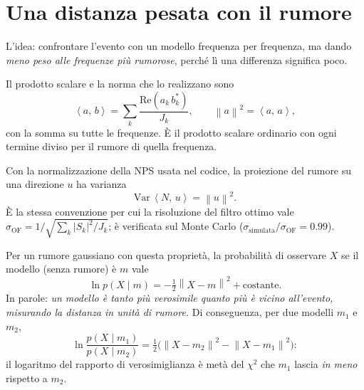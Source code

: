\documentclass[11pt,a4paper]{article}
\newcommand{\scal}[2]{\left\langle #1,\, #2 \right\rangle}
\newcommand{\norm}[1]{\left\lVert #1 \right\rVert}
\begin{document}
\section{Una distanza pesata con il rumore}
\begin{idea}
L'idea: confrontare l'evento con un modello frequenza per frequenza, ma dando \emph{meno peso alle
frequenze più rumorose}, perché lì una differenza significa poco.
\end{idea}
Il prodotto scalare e la norma che lo realizzano sono
\begin{equation}
  \scal{a}{b} = \sum_k \frac{\mathrm{Re}\!\left(a_k\, b_k^{*}\right)}{J_k},
  \qquad \norm{a}^2 = \scal{a}{a},
  \label{eq:metrica}
\end{equation}
con la somma su tutte le frequenze. È il prodotto scalare ordinario con ogni termine diviso per il
rumore di quella frequenza.

Con la normalizzazione della NPS usata nel codice, la proiezione del rumore su una direzione $u$
ha varianza
\begin{equation}
  \mathrm{Var}\,\scal{N}{u} = \norm{u}^2 .
  \label{eq:varianza}
\end{equation}
È la stessa convenzione per cui la risoluzione del filtro ottimo vale
$\sigma_\mathrm{OF} = 1/\sqrt{\sum_k |S_k|^2/J_k}$; è verificata sul Monte Carlo
($\sigma_\text{simulata}/\sigma_\mathrm{OF} = 0.99$).

Per un rumore gaussiano con questa proprietà, la probabilità di osservare $X$ se il modello
(senza rumore) è $m$ vale
\begin{equation}
  \ln p(X \mid m) = -\tfrac12 \norm{X - m}^2 + \text{costante}.
  \label{eq:verosimiglianza}
\end{equation}
In parole: \emph{un modello è tanto più verosimile quanto più è vicino all'evento, misurando la
distanza in unità di rumore.} Di conseguenza, per due modelli $m_1$ e $m_2$,
\begin{equation}
  \ln \frac{p(X\mid m_1)}{p(X\mid m_2)} = \tfrac12\Big(\norm{X-m_2}^2 - \norm{X-m_1}^2\Big):
  \label{eq:rapporto}
\end{equation}
il logaritmo del rapporto di verosimiglianza è metà del $\chi^2$ che $m_1$ lascia \emph{in meno}
rispetto a $m_2$.
\end{document}
